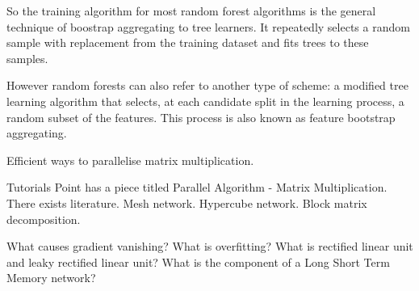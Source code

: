 So the training algorithm for most random forest algorithms is the general technique of boostrap aggregating to tree learners. It repeatedly selects a random sample with replacement from the training dataset and fits trees to these samples.

However random forests can also refer to another type of scheme: a modified tree learning algorithm that selects, at each candidate split in the learning process, a random subset of the features. This process is also known as feature bootstrap aggregating.

Efficient ways to parallelise matrix multiplication.

Tutorials Point has a piece titled Parallel Algorithm - Matrix Multiplication. There exists literature. Mesh network. Hypercube network. Block matrix decomposition.

What causes gradient vanishing? What is overfitting? What is rectified linear unit and leaky rectified linear unit? What is the component of a Long Short Term Memory network?

